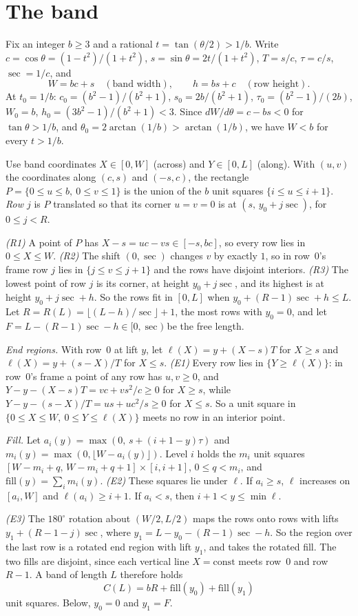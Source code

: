 \documentclass[11pt,letterpaper]{amsart}
\theoremstyle{plain}
\theoremstyle{remark}
\newcommand{\fl}[1]{\lfloor #1 \rfloor}
\begin{document}
\section{The band}\label{sec:band}

Fix an integer $b\ge3$ and a rational $t=\tan(\theta/2)>1/b$. Write $c=\cos\theta=(1-t^2)/(1+t^2)$, $s=\sin\theta=2t/(1+t^2)$, $T=s/c$, $\tau=c/s$, $\sec=1/c$, and
\[
W=bc+s\quad(\text{band width}),\qquad h=bs+c\quad(\text{row height}).
\]
At $t_0=1/b$: $c_0=(b^2-1)/(b^2+1)$, $s_0=2b/(b^2+1)$, $\tau_0=(b^2-1)/(2b)$, $W_0=b$, $h_0=(3b^2-1)/(b^2+1)<3$. Since $dW/d\theta=c-bs<0$ for $\tan\theta>1/b$, and $\theta_0=2\arctan(1/b)>\arctan(1/b)$, we have $W<b$ for every $t>1/b$.

Use band coordinates $X\in[0,W]$ (across) and $Y\in[0,L]$ (along). With $(u,v)$ the coordinates along $(c,s)$ and $(-s,c)$, the rectangle $P=\{0\le u\le b,\ 0\le v\le1\}$ is the union of the $b$ unit squares $\{i\le u\le i+1\}$. \emph{Row $j$} is $P$ translated so that its corner $u=v=0$ is at $(s,\,y_0+j\sec)$, for $0\le j<R$.

\emph{(R1)} A point of $P$ has $X-s=uc-vs\in[-s,bc]$, so every row lies in $0\le X\le W$. \emph{(R2)} The shift $(0,\sec)$ changes $v$ by exactly $1$, so in row~$0$'s frame row $j$ lies in $\{j\le v\le j+1\}$ and the rows have disjoint interiors. \emph{(R3)} The lowest point of row $j$ is its corner, at height $y_0+j\sec$, and its highest is at height $y_0+j\sec+h$. So the rows fit in $[0,L]$ when $y_0+(R-1)\sec+h\le L$. Let $R=R(L)=\fl{(L-h)/\sec}+1$, the most rows with $y_0=0$, and let $F=L-(R-1)\sec-h\in[0,\sec)$ be the free length.

\emph{End regions.} With row~$0$ at lift $y$, let $\ell(X)=y+(X-s)T$ for $X\ge s$ and $\ell(X)=y+(s-X)/T$ for $X\le s$. \emph{(E1)} Every row lies in $\{Y\ge\ell(X)\}$: in row~$0$'s frame a point of any row has $u,v\ge0$, and $Y-y-(X-s)T=vc+vs^2/c\ge0$ for $X\ge s$, while $Y-y-(s-X)/T=us+uc^2/s\ge0$ for $X\le s$. So a unit square in $\{0\le X\le W,\ 0\le Y\le\ell(X)\}$ meets no row in an interior point.

\emph{Fill.} Let $a_i(y)=\max(0,\,s+(i+1-y)\tau)$ and $m_i(y)=\max(0,\fl{W-a_i(y)})$. Level $i$ holds the $m_i$ unit squares $[W-m_i+q,\,W-m_i+q+1]\times[i,i+1]$, $0\le q<m_i$, and $\mathrm{fill}(y)=\sum_i m_i(y)$. \emph{(E2)} These squares lie under $\ell$. If $a_i\ge s$, $\ell$ increases on $[a_i,W]$ and $\ell(a_i)\ge i+1$. If $a_i<s$, then $i+1<y\le\min\ell$.

\emph{(E3)} The $180^\circ$ rotation about $(W/2,L/2)$ maps the rows onto rows with lifts $y_1+(R-1-j)\sec$, where $y_1=L-y_0-(R-1)\sec-h$. So the region over the last row is a rotated end region with lift $y_1$, and takes the rotated fill. The two fills are disjoint, since each vertical line $X=\mathrm{const}$ meets row~$0$ and row $R-1$. A band of length $L$ therefore holds
\[
C(L)=bR+\mathrm{fill}(y_0)+\mathrm{fill}(y_1)
\]
unit squares. Below, $y_0=0$ and $y_1=F$.
\end{document}
